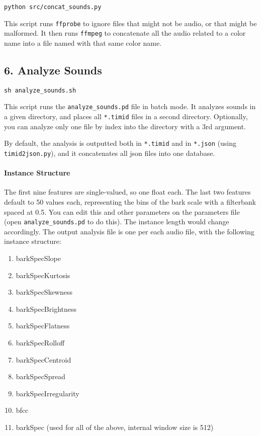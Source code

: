 \texttt{python\ src/concat\_sounds.py}

This script runs \texttt{ffprobe} to ignore files that might not be audio, or that might be malformed. It then runs \texttt{ffmpeg} to concatenate all the audio related to a color name into a file named with that same color name.




\subsection*{6. Analyze Sounds}

\texttt{sh\ analyze\_sounds.sh}

This script runs the \texttt{analyze\_sounds.pd} file in batch mode. It analyzes sounds in a given directory, and places all \texttt{*.timid} files in a second directory. Optionally, you can analyze only one file by index into the directory with a 3rd argument.

By default, the analysis is outputted both in \texttt{*.timid} and in \texttt{*.json} (using \texttt{timid2json.py}), and it concatenates all \gls{json} files into one database.


\paragraph{Instance Structure}

The first nine features are single-valued, so one float each. The last two features default to 50 values each, representing the bins of the bark scale with a filterbank spaced at 0.5. You can edit this and other parameters on the parameters file (open \texttt{analyze\_sounds.pd} to do this). The instance length would change accordingly. The output analysis file is one per each audio file, with the following instance structure:

\begin{enumerate}
\def\labelenumi{\arabic{enumi}.}
  \singlespacing
  \singlespacing
\tightlist
\item
  barkSpecSlope
\item
  barkSpecKurtosis
\item
  barkSpecSkewness
\item
  barkSpecBrightness
\item
  barkSpecFlatness
\item
  barkSpecRolloff
\item
  barkSpecCentroid
\item
  barkSpecSpread
\item
  barkSpecIrregularity
\item
  bfcc
\item
  barkSpec (used for all of the above, internal window size is 512)
\end{enumerate}

